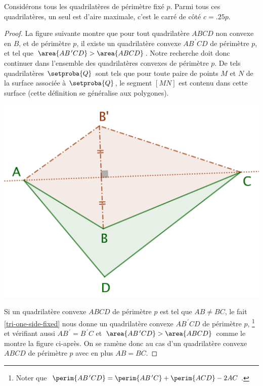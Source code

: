 \begin{fact} \label{quadri}
	Considérons tous les quadrilatères de périmètre fixé $p$. Parmi tous ces quadrilatères, un seul est d'aire maximale, c'est le carré de côté $c = \num{.25} p$.
\end{fact}


\begin{proof}
	La figure suivante montre que pour tout quadrilatère $ABCD$ non convexe en $B$, et de périmètre $p$, il existe un quadrilatère convexe $AB^{\,\prime}CD$ de périmètre $p$, et tel que $\area{AB^{\,\prime}CD} > \area{ABCD}$.
	Notre recherche doit donc continuer dans l'ensemble des quadrilatères convexes de périmètre $p$.
	De tels quadrilatères $\setproba{Q}$ sont tels que pour toute paire de points $M$ et $N$ de la surface associée à $\setproba{Q}$, le segment $[MN]$ est contenu dans cette surface (cette définition se généralise aux polygones).

	\begin{center}
		\includegraphics[scale=.4]{content/quadrilateral/non-convex.png}
	\end{center}
	
	
	Si un quadrilatère convexe $ABCD$ de périmètre $p$ est tel que $AB \neq BC$, le fait \ref{tri-one-side-fixed} nous donne un quadrilatère convexe $AB^{\,\prime}CD$ de périmètre $p$,%
	\footnote{
		Noter que
		$\perim{AB^{\,\prime}CD} = \perim{AB^{\,\prime}C} + \perim{ACD} - 2 AC$.
	}
	et vérifiant aussi $AB^{\,\prime} = B^{\,\prime}C$ et $\area{AB^{\,\prime}CD} > \area{ABCD}$ comme le montre la figure ci-après.
	On se ramène donc au cas d'un quadrilatère convexe $ABCD$ de périmètre $p$ avec en plus $AB = BC$.


\end{proof}
